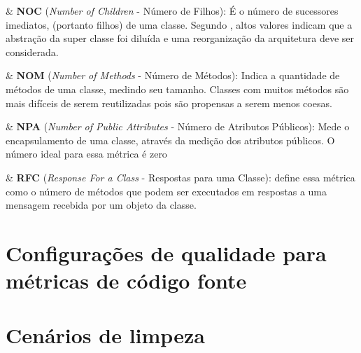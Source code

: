 \begin{easylist}
	& \textbf{NOC} (\textit{Number of Children} - Número de Filhos): É o número de sucessores imediatos,  (portanto filhos) de uma classe. Segundo \cite{softwaremeasurementandestimation}, altos valores indicam que a abstração da super classe foi diluída e uma reorganização da arquitetura deve ser considerada.
	
	& \textbf{NOM} (\textit{Number of Methods} - Número de Métodos): Indica a quantidade de métodos de uma classe, medindo seu tamanho. Classes com muitos métodos são mais difíceis de serem reutilizadas pois são propensas a serem menos coesas. \cite{Meirelles2013}  

	& \textbf{NPA} (\textit{Number of Public Attributes} - Número de Atributos Públicos): Mede o encapsulamento de uma classe, através da medição dos atributos públicos. O número ideal para essa métrica é zero \cite{Meirelles2013}

	& \textbf{RFC} (\textit{Response For a Class} - Respostas para uma Classe): \cite{metricsandmodels} define essa métrica como o número de métodos que podem ser executados em respostas a uma mensagem recebida por um objeto da classe.

\end{easylist}	


\section{Configurações de qualidade para métricas de código fonte} 


\section{Cenários de limpeza} 